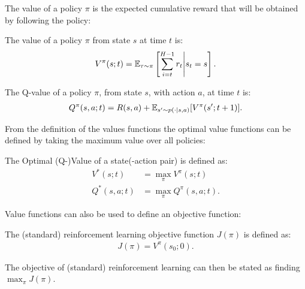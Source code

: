     The value of a policy $\pi$ is the expected cumulative reward that will be obtained by following the policy:
    \begin{defn}
        \label{def:2:value}
        \label{def:2:q_value}
        The \textnormal{value} of a policy $\pi$ from state $s$ at time $t$ is:
        \begin{align}
            V^{\pi}(s;t) = \mathbb{E}_{\tau\sim\pi}\left[\sum_{i=t}^{H-1} r_t \Bigg| s_t=s \right]. \label{eq:2:value_fn_def}
        \end{align} 

        The \textnormal{Q-value} of a policy $\pi$, from state $s$, with action $a$, at time $t$ is:
        \begin{align}
            Q^{\pi}(s,a;t) = R(s,a) + \mathbb{E}_{s'\sim p(\cdot|s,a)} [V^{\pi}(s';t+1)]. \label{eq:2:q_value_fn_def}
        \end{align} 
    \end{defn}

    From the definition of the values functions the optimal value functions can be defined by taking the maximum value over all policies:
    \begin{defn}
        \label{def:2:optimal_value}
        \label{def:2:optimal_q_value}
        The \textnormal{Optimal (Q-)Value} of a state(-action pair) is defined as:
        \begin{align}
            V^*(s;t) &= \max_{\pi} V^{\pi}(s;t) \label{eq:2:opt_value_fn_def} \\
            Q^*(s,a;t) &= \max_{\pi} Q^{\pi}(s,a;t). \label{eq:2:opt_q_value_fn_def}
        \end{align}
    \end{defn}

    Value functions can also be used to define an objective function:
    \begin{defn}
        \label{def:2:rl_obj_fn}
        The \textnormal{(standard) reinforcement learning objective function} $J(\pi)$ is defined as:
        \begin{align}
            J(\pi) = V^{\pi}(s_0;0). \label{eq:2:rl_obj_fn_def}
        \end{align}

        The objective of (standard) reinforcement learning can then be stated as finding $\max_{\pi} J(\pi)$.
    \end{defn}


